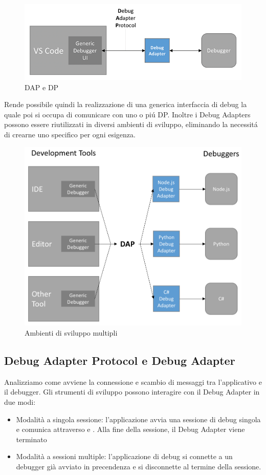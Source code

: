 \begin{figure}[H]
    \centering
    \includegraphics[width=0.7\columnwidth]{images/debug-arch1.png}
    \caption{DAP e DP}
    \label{fig:dap e dp}
\end{figure}

Rende possibile quindi la realizzazione di una generica interfaccia di debug la quale poi si occupa di comunicare con uno o piú DP. Inoltre i Debug Adapters possono essere riutilizzati in diversi ambienti di sviluppo, eliminando la necessitá di crearne uno specifico per ogni esigenza. 

\begin{figure}[H]
    \centering
    \includegraphics[width=0.7\columnwidth]{images/with-DAP.png}
    \caption{Ambienti di sviluppo multipli}
    \label{fig:Ambienti di sviluppo multipli}
\end{figure}

\subsection{Debug Adapter Protocol e Debug Adapter}

Analizziamo come avviene la connessione e scambio di messaggi tra l'applicativo e il debugger. Gli strumenti di sviluppo possono interagire con il Debug Adapter in due modi:
\begin{itemize}
    \item {
        Modalità a singola sessione: l'applicazione avvia una sessione di debug singola e comunica attraverso  e . Alla fine della sessione, il Debug Adapter viene terminato
    }
    \item {
        Modalità a sessioni multiple: l'applicazione di debug si connette a un debugger già avviato in precendenza e si disconnette al termine della sessione.
    }
\end{itemize}


